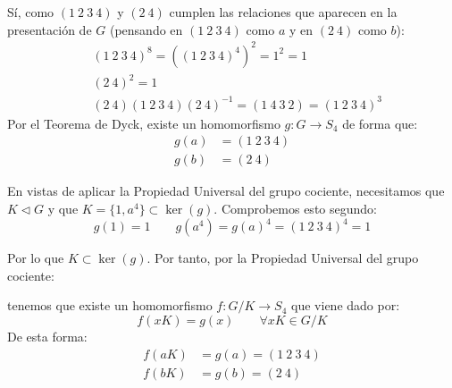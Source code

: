 \documentclass[12pt]{article}
\begin{document}
\begin{ejercicio}[2.5 puntos]
\begin{enumerate}
                Sí, como $(1\ 2\ 3\ 4)$ y $(2\ 4)$ cumplen las relaciones que aparecen en la presentación de $G$ (pensando en $(1\ 2\ 3\ 4)$ como $a$ y en $(2\ 4)$ como $b$):
                \begin{align*}
                    &{(1\ 2\ 3\ 4)}^{8} = {\left({(1\ 2\ 3\ 4)}^{4}\right)}^{2} = 1^2 = 1 \\
                    &{(2\ 4)}^{2} = 1 \\
                    &(2\ 4)(1\ 2\ 3\ 4){(2\ 4)}^{-1} = (1\ 4\ 3\ 2) = {(1\ 2\ 3\ 4)}^{3}
                \end{align*}
                Por el Teorema de Dyck, existe un homomorfismo $g:G\to S_4$ de forma que:
                \begin{align*}
                    g(a) &= (1\ 2\ 3\ 4) \\
                    g(b) &= (2\ 4)
                \end{align*}

                En vistas de aplicar la Propiedad Universal del grupo cociente, necesitamos que $K\lhd G$ y que $K=\{1,a^4\}\subset \ker(g)$. Comprobemos esto segundo:
                \begin{equation*}
                    g(1) = 1 \qquad g(a^4) = g(a)^4 = (1\ 2\ 3\ 4)^4 = 1
                \end{equation*}

                Por lo que $K\subset \ker(g)$. Por tanto, por la Propiedad Universal del grupo cociente: 
                \begin{figure}[H]
                    \centering
                \end{figure}
                tenemos que existe un homomorfismo $f:G/K\to S_4$ que viene dado por:
                \begin{equation*}
                    f(xK) = g(x) \qquad \forall xK\in G/K
                \end{equation*}
                De esta forma:
                \begin{align*}
                    f(aK) &= g(a) = (1\ 2\ 3\ 4) \\
                    f(bK) &= g(b) = (2\ 4)
                \end{align*}
        \end{enumerate}
    \end{ejercicio}
\end{document}
